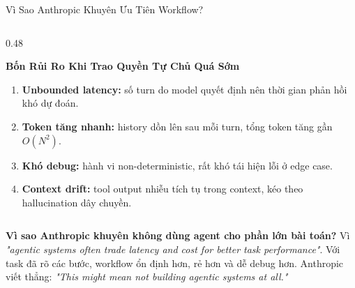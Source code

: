 \documentclass[aspectratio=1610,10pt,xcolor={table}]{beamer}
\begin{document}
\begin{frame}{Vì Sao Anthropic Khuyên Ưu Tiên Workflow?}
\begin{columns}[t]
    \begin{column}{0.48\textwidth}
      \begin{alertblock}{\textbf{Bốn Rủi Ro Khi Trao Quyền Tự Chủ Quá Sớm}}
        \scriptsize
        \begin{enumerate}
          \item \textbf{Unbounded latency:} số turn do model quyết định nên thời gian phản hồi khó dự đoán.
          \item \textbf{Token tăng nhanh:} history dồn lên sau mỗi turn, tổng token tăng gần $O(N^2)$.
          \item \textbf{Khó debug:} hành vi non-deterministic, rất khó tái hiện lỗi ở edge case.
          \item \textbf{Context drift:} tool output nhiễu tích tụ trong context, kéo theo hallucination dây chuyền.
        \end{enumerate}
      \end{alertblock}
    \end{column}
  \end{columns}

  \vspace{0.15cm}
  \begin{tcolorbox}[colback=boxbg,colframe=darkred,title={\textbf{Trả Lời Câu Hỏi Trong Đề Cương}},fonttitle=\footnotesize\bfseries]
    \footnotesize \textbf{Vì sao Anthropic khuyên không dùng agent cho phần lớn bài toán?} Vì \textit{"agentic systems often trade latency and cost for better task performance"}. Với task đã rõ các bước, workflow ổn định hơn, rẻ hơn và dễ debug hơn. Anthropic viết thẳng: \textit{"This might mean not building agentic systems at all."}
  \end{tcolorbox}
\end{frame}
\end{document}

